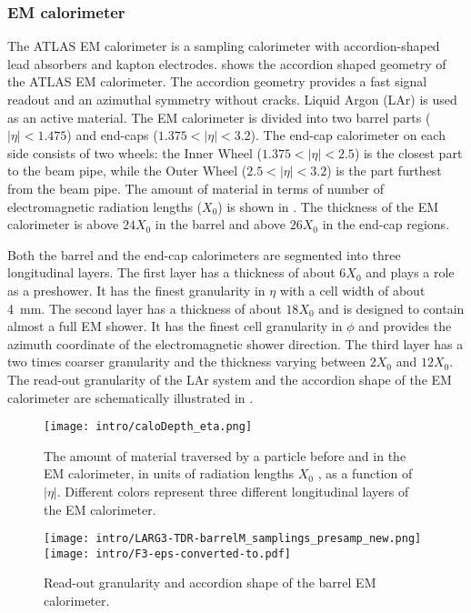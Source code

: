 \subsubsection{EM calorimeter}
The ATLAS EM calorimeter is a sampling calorimeter with accordion-shaped lead absorbers and kapton electrodes.
 shows the accordion shaped geometry of the ATLAS EM calorimeter. The accordion geometry provides a fast signal readout and an azimuthal symmetry without cracks. Liquid Argon (LAr) is used as an active material. The EM calorimeter is divided into two barrel parts ($|\eta|<1.475$) and end-caps ($1.375<|\eta|<3.2$).
The end-cap calorimeter on each side consists of two wheels: the Inner Wheel ($1.375<|\eta|<2.5$) is the closest part to the beam pipe, while the
Outer Wheel ($2.5<|\eta|<3.2$) is the part furthest from the beam pipe.
The amount of material in terms of number of electromagnetic radiation lengths ($X_0$) is shown in .
The thickness of the EM calorimeter is above $24 X_0$ in the barrel and above $26 X_0$ in the end-cap regions.

Both the barrel and the end-cap calorimeters are segmented into three longitudinal layers. The first layer has a thickness of about $6 X_0$ and plays a role as a preshower. It has the finest granularity in $\eta$ with a cell width of about 4~mm. The second layer has a thickness of about $18 X_0$ and is designed to contain almost a full EM shower. It has the finest cell granularity in $\phi$ and provides the azimuth coordinate of the electromagnetic shower direction. The third layer has a two times coarser granularity and the thickness varying between $2 X_0$ and $12 X_0$. The read-out granularity of the LAr system and the accordion shape of the EM calorimeter are schematically illustrated in .

\begin{figure}[h!]
\centering
 \texttt{[image: intro/caloDepth\_eta.png]}
 \caption{
 The amount of material traversed by a particle before and in the EM calorimeter, in units of radiation lengths $X_0$ , as a function of $|\eta|$. Different colors represent three different longitudinal layers of the EM calorimeter.}
\label{fig:material_budget_calo}
\end{figure}

\begin{figure}[h!]
\centering
 \texttt{[image: intro/LARG3-TDR-barrelM\_samplings\_presamp\_new.png]}
 \texttt{[image: intro/F3-eps-converted-to.pdf]}
 \caption{Read-out granularity and accordion shape of the barrel EM calorimeter.}
\label{fig:EMgran}
\end{figure}

